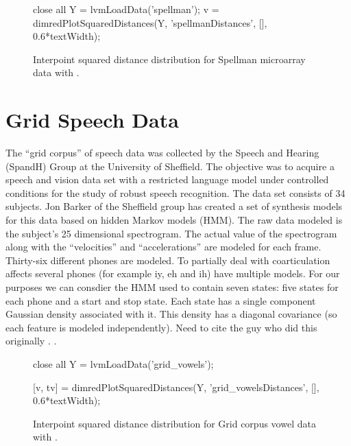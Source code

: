 \begin{figure}
  \begin{matlab}
    close all
    Y = lvmLoadData('spellman');
    v = dimredPlotSquaredDistances(Y, 'spellmanDistances', [], 0.6*textWidth);
  \end{matlab}

  \begin{center}
  \end{center}
    
  
  \caption{Interpoint squared distance distribution for Spellman
    microarray data with \captionInfo.}
  
\end{figure}


\section{Grid Speech Data}

The ``grid corpus'' of speech data was collected by the Speech and
Hearing (SpandH) Group at the University of Sheffield. The objective
was to acquire a speech and vision data set with a restricted language
model under controlled conditions for the study of robust speech
recognition. The data set consists of 34 subjects. Jon Barker of the
Sheffield group has created a set of synthesis models for this data
based on hidden Markov models (HMM). The raw data modeled is the subject's 25 dimensional
spectrogram. The actual value of the spectrogram along with the
``velocities'' and ``accelerations'' are modeled for each
frame. Thirty-six different phones are modeled. To partially deal with
coarticulation affects several phones (for example \textsf{iy},
\textsf{eh} and \textsf{ih}) have multiple models. For our purposes we
can consdier the HMM used to contain seven states: five states for
each phone and a start and stop state. Each state has a single
component Gaussian density associated with it. This density has a
diagonal covariance (so each feature is modeled independently). Need
to cite the guy who did this originally \cite{unknown}. .

\begin{figure}
  \begin{matlab}
    close all
    Y = lvmLoadData('grid_vowels');
    
    [v, tv] = dimredPlotSquaredDistances(Y, 'grid_vowelsDistances', [], 0.6*textWidth);
  \end{matlab}
  \begin{center}
  \end{center}
  
  \caption{Interpoint squared distance distribution for Grid corpus vowel data with \captionInfo.}
  
\end{figure}


